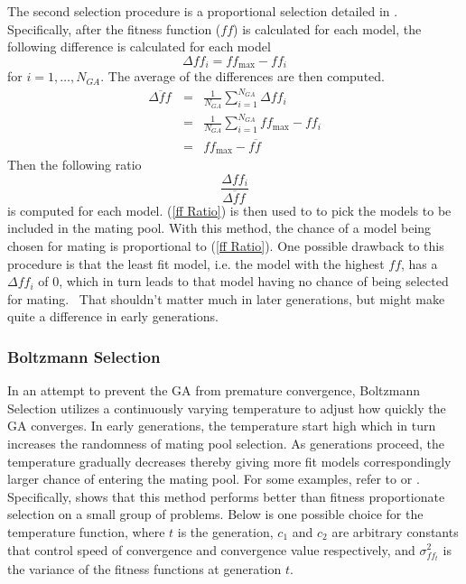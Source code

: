 The second selection procedure is a proportional selection detailed
in \citet{Bozd:2003}. Specifically, after the fitness function ($ff$)
is calculated for each model, the following difference is calculated
for each model
\begin{equation}
\Delta ff_{i}=ff_{\max}-ff_{i}
\end{equation}
for $i=1,\ldots,N_{GA}$. The average of the differences are then
computed.
\begin{eqnarray}
\overline{\Delta ff\,} & = & \frac{1}{N_{GA}}\sum_{i=1}^{N_{GA}}\Delta ff_{i}\nonumber \\
 & = & \frac{1}{N_{GA}}\sum_{i=1}^{N_{GA}}ff_{\max}-ff_{i}\nonumber \\
 & = & ff_{\max}-\overline{ff\,}
\end{eqnarray}
Then the following ratio
\begin{equation}
\frac{\Delta ff_{i}}{\overline{\Delta ff\,}}\label{ff Ratio}
\end{equation}
is computed for each model. (\ref{ff Ratio}) is then used to to pick
the models to be included in the mating pool. With this method, the
chance of a model being chosen for mating is proportional to (\ref{ff Ratio}).
One possible drawback to this procedure is that the least fit model,
i.e. the model with the highest $ff$, has a $\Delta ff_{i}$ of $0$,
which in turn leads to that model having no chance of being selected
for mating. \ That shouldn't matter much in later generations, but
might make quite a difference in early generations.


\subsubsection{Boltzmann Selection}

In an attempt to prevent the GA from premature convergence, Boltzmann
Selection utilizes a continuously varying \textquotedbl{}temperature\textquotedbl{}
to adjust how quickly the GA converges. In early generations, the
temperature start high which in turn increases the randomness of mating
pool selection. As generations proceed, the temperature gradually
decreases thereby giving more fit models correspondingly larger chance
of entering the mating pool. For some examples, refer to \citet{Gold:1990}
or \citet{DeMa:Tid:1991}. Specifically, \citet{DeMa:Tid:1991} shows
that this method performs better than fitness proportionate selection
on a small group of problems. Below is one possible choice for the
temperature function, where $t$ is the generation, $c_{1}$ and $c_{2}$
are arbitrary constants that control speed of convergence and convergence
value respectively, and $\sigma_{ff_{t}}^{2}$ is the variance of
the fitness functions at generation $t$.

